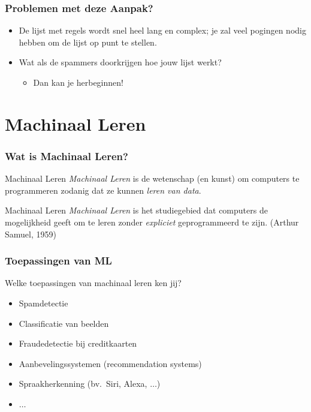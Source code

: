 \documentclass[aspectratio=169]{beamer}
\begin{document}
\begin{frame}
\frametitle{Problemen met deze Aanpak?}
\pause
\begin{itemize}
\item De lijst met regels wordt snel heel lang en complex; je zal veel pogingen nodig hebben om de lijst op punt te stellen.
\item Wat als de spammers doorkrijgen hoe jouw lijst werkt?
\begin{itemize}
	\item Dan kan je herbeginnen!
\end{itemize}
\end{itemize}
\end{frame}

\section{Machinaal Leren}

\begin{frame}
\frametitle{Wat is Machinaal Leren?}
\begin{block}{Machinaal Leren}
\emph{Machinaal Leren} is de wetenschap (en kunst) om computers te programmeren zodanig dat ze kunnen \emph{leren van data}.
\end{block}

\begin{block}{Machinaal Leren}
	\emph{Machinaal Leren} is het studiegebied dat computers de mogelijkheid geeft om te leren zonder \emph{expliciet} geprogrammeerd te zijn.
	 (Arthur Samuel, 1959)
\end{block}
\end{frame}


\begin{frame}
\frametitle{Toepassingen van ML}
Welke toepassingen van machinaal leren ken jij?
\pause
\begin{itemize}
	\item Spamdetectie
	\item Classificatie van beelden
	\item Fraudedetectie bij creditkaarten
	\item Aanbevelingssystemen (recommendation systems)
	\item Spraakherkenning (bv.\ Siri, Alexa, $\ldots$)
	\item $\ldots$
\end{itemize}
\end{frame}
\end{document}
